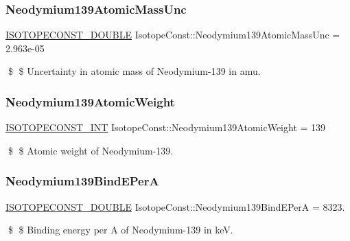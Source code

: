 \subsubsection{\texorpdfstring{Neodymium139\+Atomic\+Mass\+Unc}{Neodymium139AtomicMassUnc}}
{\footnotesize\ttfamily \mbox{\hyperlink{group___isotope_const-_macros_ga8f45a7272ce02c0b4c65c44636ed719a}{I\+S\+O\+T\+O\+P\+E\+C\+O\+N\+S\+T\+\_\+\+D\+O\+U\+B\+LE}} Isotope\+Const\+::\+Neodymium139\+Atomic\+Mass\+Unc = 2.\+963e-\/05}

\$ \$ Uncertainty in atomic mass of Neodymium-\/139 in amu. \mbox{\label{group___isotope_const-_neodymium-_nd139_gac92f028cc4e5c85ce6e1377749f67fb9}} 
\subsubsection{\texorpdfstring{Neodymium139\+Atomic\+Weight}{Neodymium139AtomicWeight}}
{\footnotesize\ttfamily \mbox{\hyperlink{group___isotope_const-_macros_ga5f18360b3e99483a35c32d789e62621c}{I\+S\+O\+T\+O\+P\+E\+C\+O\+N\+S\+T\+\_\+\+I\+NT}} Isotope\+Const\+::\+Neodymium139\+Atomic\+Weight = 139}

\$ \$ Atomic weight of Neodymium-\/139. \mbox{\label{group___isotope_const-_neodymium-_nd139_gac78e9050601b328547aff154dc5d3a36}} 
\subsubsection{\texorpdfstring{Neodymium139\+Bind\+E\+PerA}{Neodymium139BindEPerA}}
{\footnotesize\ttfamily \mbox{\hyperlink{group___isotope_const-_macros_ga8f45a7272ce02c0b4c65c44636ed719a}{I\+S\+O\+T\+O\+P\+E\+C\+O\+N\+S\+T\+\_\+\+D\+O\+U\+B\+LE}} Isotope\+Const\+::\+Neodymium139\+Bind\+E\+PerA = 8323.}

\$ \$ Binding energy per A of Neodymium-\/139 in keV. \mbox{\label{group___isotope_const-_neodymium-_nd139_ga0114d1e3c2cabcc126032a2caee794c2}} 
